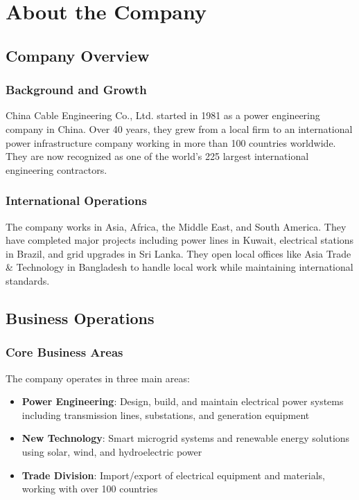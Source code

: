 
\chapter{About the Company}

\section{Company Overview}

\subsection{Background and Growth}
China Cable Engineering Co., Ltd. started in 1981 as a power engineering company in China. Over 40 years, they grew from a local firm to an international power infrastructure company working in more than 100 countries worldwide. They are now recognized as one of the world's 225 largest international engineering contractors.

\subsection{International Operations}
The company works in Asia, Africa, the Middle East, and South America. They have completed major projects including power lines in Kuwait, electrical stations in Brazil, and grid upgrades in Sri Lanka. They open local offices like Asia Trade \& Technology in Bangladesh to handle local work while maintaining international standards.

\vspace{0.5em}

\section{Business Operations}

\subsection{Core Business Areas}
The company operates in three main areas:

\begin{itemize}[leftmargin=*, itemsep=0.25em]
    \item \textbf{Power Engineering}: Design, build, and maintain electrical power systems including transmission lines, substations, and generation equipment
    \item \textbf{New Technology}: Smart microgrid systems and renewable energy solutions using solar, wind, and hydroelectric power
    \item \textbf{Trade Division}: Import/export of electrical equipment and materials, working with over 100 countries
\end{itemize}


